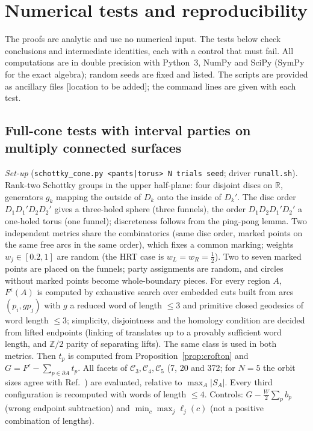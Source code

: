 \documentclass[aps,prd,onecolumn,superscriptaddress,nofootinbib,amsmath,amssymb,11pt]{revtex4-2}
\theoremstyle{definition}
\newcommand{\R}{\mathbb{R}}
\newcommand{\Z}{\mathbb{Z}}
\newcommand{\eps}{\epsilon}
\begin{document}
\section{Numerical tests and reproducibility}\label{sec:numerics}

The proofs are analytic and use no numerical input. The tests below check conclusions and intermediate identities, each with a
control that must fail. All computations are in double precision with Python~3, NumPy and SciPy (SymPy for the exact algebra);
random seeds are fixed and listed. The scripts are provided as ancillary files [location to be added]; the command lines are given
with each test.

\subsection{Full-cone tests with interval parties on multiply connected surfaces}

\emph{Set-up} (\texttt{schottky\_cone.py <pants|torus> N trials seed}; driver \texttt{runall.sh}). Rank-two Schottky groups in the
upper half-plane: four disjoint discs on $\R$, generators $g_k$ mapping the outside of $D_k$ onto the inside of $D_k'$. The disc order
$D_1D_1'D_2D_2'$ gives a three-holed sphere (three funnels), the order $D_1D_2D_1'D_2'$ a one-holed torus (one funnel); discreteness
follows from the ping-pong lemma. Two independent metrics share the combinatorics (same disc order, marked points on the same free
arcs in the same order), which fixes a common marking; weights $w_j\in[0.2,1]$ are random (the HRT case is $w_L=w_R=\frac12$). Two to
seven marked points are placed on the funnels; party assignments are random, and circles without marked points become whole-boundary
pieces. For every region $A$, $F^\eps(A)$ is computed by exhaustive search over embedded cuts built from arcs $(p_i,gp_j)$ with $g$ a
reduced word of length $\le3$ and primitive closed geodesics of word length $\le3$; simplicity, disjointness and the homology
condition are decided from lifted endpoints (linking of translates up to a provably sufficient word length, and $\Z/2$ parity of
separating lifts). The same class is used in both metrics. Then $t_p$ is computed from Proposition~\ref{prop:crofton} and
$G=F^\eps-\sum_{p\in\partial A}t_p$. All facets of $\mathcal C_3,\mathcal C_4,\mathcal C_5$ (7, 20 and 372; for $N=5$ the orbit sizes
agree with Ref.~\cite{AvisHernandezCuenca2023}) are evaluated, relative to $\max_A|S_A|$. Every third configuration is recomputed with
words of length $\le4$. Controls: $G-\frac W2\sum_pb_p$ (wrong endpoint subtraction) and $\min_c\max_j\ell_j(c)$ (not a positive
combination of lengths).
\end{document}
